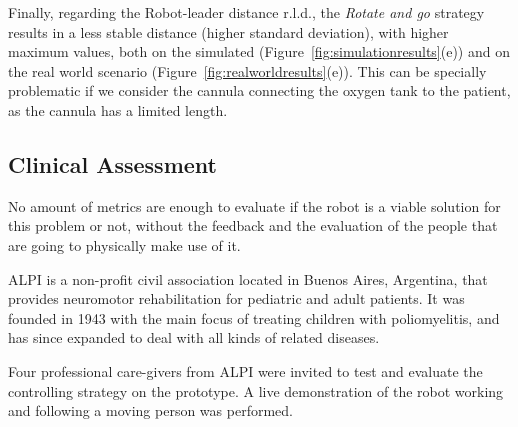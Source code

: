 \documentclass[journal]{IEEEtran}
\begin{document}




Finally, regarding the Robot-leader distance r.l.d., the \textit{Rotate and go} strategy results in a less stable distance (higher standard deviation), with higher maximum values, both on the simulated (Figure~\ref{fig:simulationresults}(e)) and on the real world scenario (Figure~\ref{fig:realworldresults}(e)).  This can be specially problematic if we consider the cannula connecting the oxygen tank to the patient, as the cannula has a limited length.  


\subsection{Clinical Assessment} 
\label{clinical}

No amount of metrics are enough to evaluate if the robot is a viable solution for this problem or not, without the feedback and the evaluation of the people that are going to physically make use of it. 

ALPI is a non-profit civil association located in Buenos Aires, Argentina, that provides neuromotor rehabilitation for pediatric and adult patients. It was founded in 1943 with the main focus of treating children with poliomyelitis, and has since expanded to deal with all kinds of related diseases. 

Four professional care-givers from ALPI  were invited to test and evaluate the controlling strategy on the prototype.  A live demonstration of the robot working and following a moving person was performed.
\end{document}
